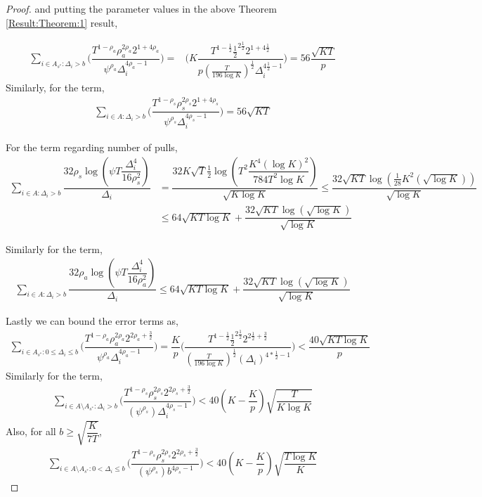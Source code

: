 \begin{proof}
and putting the parameter values in the above Theorem \ref{Result:Theorem:1} result,	
	
	\begin{align*}
	\sum_{i\in A_{s^{*}}:\Delta_{i} > b}\bigg(\dfrac{T^{1-\rho_{a}}\rho_{a}^{2\rho_{a}}2^{1+4\rho_{a}}}{\psi^{\rho_{a}}\Delta_{i}^{4\rho_{a}-1}} \bigg)=& \bigg(K\dfrac{T^{1-\frac{1}{2}}\frac{1}{2}^{2\frac{1}{2}}2^{1+4\frac{1}{2}}}{p(\frac{T}{196 \log K})^{\frac{1}{2}}\Delta_{i}^{4\frac{1}{2}-1}} \bigg)=56\dfrac{\sqrt{KT}}{p}
	\end{align*}		
	 Similarly, for the term, 
	 \begin{align*}
	 \sum_{i\in A:\Delta_{i} > b}\bigg(\dfrac{T^{1-\rho_{s}}\rho_{s}^{2\rho_{s}}2^{1+4\rho_{s}}}{\psi^{\rho_{s}}\Delta_{i}^{4\rho_{s}-1}} \bigg) = 56\sqrt{KT}
	 \end{align*}
	 
	
	For the term regarding number of pulls,
	\begin{align*}
	\sum_{i\in A:\Delta_{i} > b}\dfrac{32\rho_{s}\log{(\psi T\dfrac{\Delta_{i}^{4}}{16\rho_{s}^{2}})}}{\Delta_{i}} &= \dfrac{32K\sqrt{T}\frac{1}{2}\log{(T^{2}\dfrac{K^{4}(\log K)^{2}}{784 T^{2}\log K})}}{\sqrt{K\log K}} \leq  \dfrac{32\sqrt{KT}\log{(\frac{1}{28} K^{2}(\sqrt{\log K}))}}{\sqrt{\log K}}\\
	&\leq 64\sqrt{KT\log K} + \dfrac{32\sqrt{KT}\log{(\sqrt{\log K})}}{\sqrt{\log K}}
	\end{align*}		
	
	Similarly for the term,
	\begin{align*}
	\sum_{i\in A:\Delta_{i} > b}\dfrac{32\rho_{a}\log{(\psi T\dfrac{\Delta_{i}^{4}}{16\rho_{a}^{2}})}}{\Delta_{i}} \leq 64\sqrt{KT\log K} + \dfrac{32\sqrt{KT}\log{(\sqrt{\log K})}}{\sqrt{\log K}}
	\end{align*}		
	
 	Lastly we can bound the error terms as, 
	\begin{align*}
	\sum\limits_{i\in A_{s^{*}}:0\leq\Delta_{i}\leq b}\bigg(\dfrac{T^{1-\rho_{a}}\rho_{a}^{2\rho_{a}}2^{2\rho_{a}+\frac{3}{2}}}{\psi^{\rho_{a}}\Delta_{i}^{4\rho_{a}-1}} \bigg)=\dfrac{K}{p}\bigg(\dfrac{T^{1-\frac{1}{2}}\frac{1}{2}^{2\frac{1}{2}}2^{2\frac{1}{2}+\frac{3}{2}}}{{(\frac{T}{196 \log K})^{\frac{1}{2}}}{(\Delta_{i})^{4*\frac{1}{2}-1}}} \bigg) < \dfrac{40 \sqrt{KT\log K} }{p}
	\end{align*}	 	
 	Similarly for the term,
 	\begin{align*}
 	\sum_{i\in A\setminus A_{s^*}: \Delta_{i} > b}\bigg(\dfrac{T^{1-\rho_{s}}\rho_{s}^{2\rho_{s}}2^{2\rho_{s}+\frac{3}{2}}}{(\psi^{\rho_{s}})\Delta_{i}^{4\rho_{s} -1}} \bigg) < 40(K-\dfrac{K}{p})\sqrt{\dfrac{T}{K\log K}}
	\end{align*} 	
	Also, for all $b\geq \sqrt{\dfrac{K}{7T}}$,
	\begin{align*}
 	\sum_{i\in A\setminus A_{s^*}: 0 < \Delta_{i} \leq b}\bigg(\dfrac{T^{1-\rho_{s}}\rho_{s}^{2\rho_{s}}2^{2\rho_{s}+\frac{3}{2}}}{(\psi^{\rho_{s}})b^{4\rho_{s} -1}} \bigg) < 40(K-\dfrac{K}{p})\sqrt{\dfrac{T\log K}{K}}
	\end{align*} 	
	

\end{proof}
